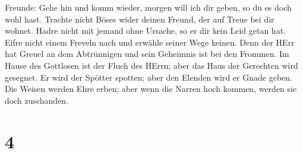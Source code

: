 Freunde: Gehe hin und komm wieder, morgen will ich dir geben, so du es
doch wohl hast.  Trachte nicht Böses wider deinen Freund,
der auf Treue bei dir wohnet.  Hadre nicht mit jemand ohne
Ursache, so er dir kein Leid getan hat.  Eifre nicht einem
Freveln nach und erwähle seiner Wege keinen.  Denn der HErr
hat Greuel an dem Abtrünnigen und sein Geheimnis ist bei den Frommen.
 Im Hause des Gottlosen ist der Fluch des HErrn; aber das
Haus der Gerechten wird gesegnet.  Er wird der Spötter
spotten; aber den Elenden wird er Gnade geben.  Die Weisen
werden Ehre erben; aber wenn die Narren hoch kommen, werden sie doch
zuschanden.

\hypertarget{section-3}{%
\section{4}\label{section-3}}

